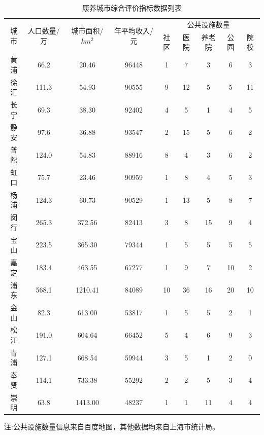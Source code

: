 \documentclass[12pt,a4paper]{article}
\begin{document}
\begin{table}[h]
  \centering
  \caption{康养城市综合评价指标数据列表}
  \begin{adjustbox}{width=\textwidth}
  \begin{tabular}{c|c|c|c|ccccc}
    \toprule[2pt]
    \multirow{2}{*}{城市} & \multirow{2}{*}{人口数量/万} & \multirow{2}{*}{城市面积/$km^2$}& \multirow{2}{*}{年平均收入/元}& \multicolumn{5}{c}{公共设施数量}\\
    \cline{5-9}
    & & & & 社区 & 医院 & 养老院 & 公园 & 院校\\
    \midrule[1pt]
    黄浦 & 66.2 & 20.46 & 96448 & 1 & 7 & 3 & 6 & 3 \\
    徐汇 & 111.3 & 54.93 & 90555 & 9 & 12 & 5 & 5 & 11 \\
    长宁 & 69.3 & 38.30 & 92402 & 4 & 5 & 1 & 4 & 5 \\
    静安 & 97.6 & 36.88 & 93547 & 2 & 15 & 5 & 6 & 2 \\
    普陀 & 124.0 & 54.83 & 88916 & 8 & 4 & 3 & 6 & 2 \\
    虹口 & 75.7 & 23.46 & 90959 & 1 & 8 & 4 & 5 & 3 \\
    杨浦 & 124.3 & 60.73 & 90529 & 1 & 13 & 5 & 8 & 7 \\
    闵行 & 265.3 & 372.56 & 82413 & 3 & 8 & 15 & 9 & 4 \\
    宝山 & 223.5 & 365.30 & 79344 & 1 & 5 & 5 & 5 & 5 \\
    嘉定 & 183.4 & 463.55 & 67277 & 1 & 9 & 7 & 10 & 2 \\
    浦东 & 568.1 & 1210.41 & 84089 & 10 & 36 & 16 & 20 & 10 \\
    金山 & 82.3 & 613.00 & 53817 & 1 & 5 & 5 & 2 & 1 \\
    松江 & 191.0 & 604.64 & 66452 & 5 & 4 & 6 & 9 & 3 \\
    青浦 & 127.1 & 668.54 & 59944 & 3 & 5 & 1 & 2 & 0 \\
    奉贤 & 114.1 & 733.38 & 55292 & 2 & 2 & 5 & 3 & 4 \\
    崇明 & 63.8 & 1413.00 & 48237 & 1 & 1 & 11 & 4 & 4 \\
    \bottomrule[2pt]
  \end{tabular}
  \end{adjustbox}

  \vspace{0.5em}
  {\footnotesize 注:公共设施数量信息来自百度地图，其他数据均来自上海市统计局。}
\end{table}
\end{document}

